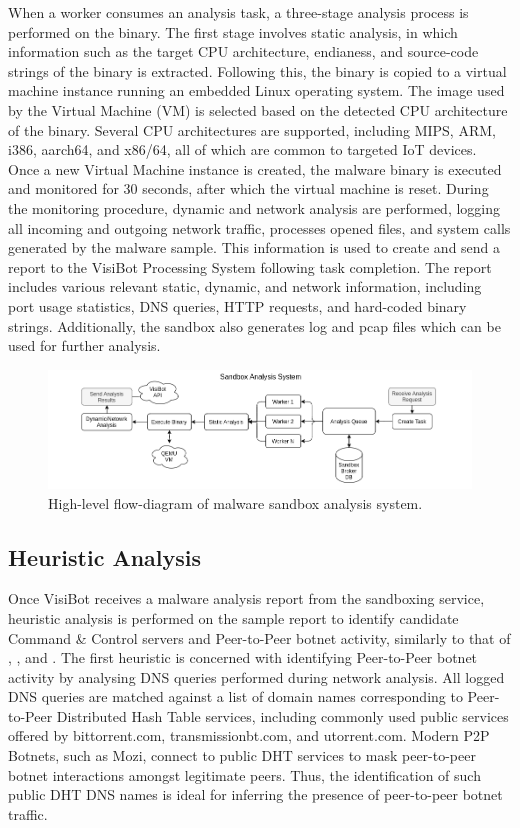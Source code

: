 When a worker consumes an analysis task, a three-stage analysis process is performed on the binary. The first stage involves static analysis, in which information such as the target CPU architecture, endianess, and source-code strings of the binary is extracted. Following this, the binary is copied to a virtual machine instance running an embedded Linux operating system. The image used by the Virtual Machine (VM) is selected based on the detected CPU architecture of the binary. Several CPU architectures are supported, including MIPS, ARM, i386, aarch64, and x86/64, all of which are common to targeted IoT devices. Once a new Virtual Machine instance is created, the malware binary is executed and monitored for 30 seconds, after which the virtual machine is reset. During the monitoring procedure, dynamic and network analysis are performed, logging all incoming and outgoing network traffic, processes opened files, and system calls generated by the malware sample. This information is used to create and send a report to the VisiBot Processing System following task completion. The report includes various relevant static, dynamic, and network information, including port usage statistics, DNS queries, HTTP requests, and hard-coded binary strings. Additionally, the sandbox also generates log and pcap files which can be used for further analysis. 

\begin{figure}[!htb]
    \centering
    \includegraphics[width=0.9\linewidth]{flowcharts/high_level_sandbox_overview.png}
    \caption{High-level flow-diagram of malware sandbox analysis system.}
    \label{fig:high_level_sandbox} 
\end{figure}

\subsection{Heuristic Analysis}

Once VisiBot receives a malware analysis report from the sandboxing service, heuristic analysis is performed on the sample report to identify candidate Command \& Control servers and Peer-to-Peer botnet activity, similarly to that of \citet{Bastos2019}, \citet{Ceron2019}, and \citet{Herwig2019}. The first heuristic is concerned with identifying Peer-to-Peer botnet activity by analysing DNS queries performed during network analysis. All logged DNS queries are matched against a list of domain names corresponding to Peer-to-Peer Distributed Hash Table services, including commonly used public services offered by bittorrent.com, transmissionbt.com, and utorrent.com. Modern P2P Botnets, such as Mozi, connect to public DHT services to mask peer-to-peer botnet interactions amongst legitimate peers. Thus, the identification of such public DHT DNS names is ideal for inferring the presence of peer-to-peer botnet traffic. 


